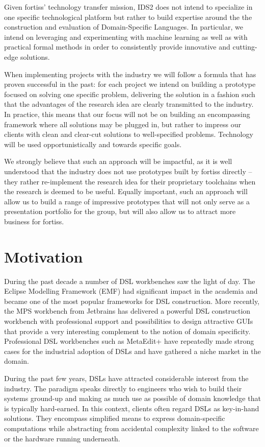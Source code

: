 \documentclass{article}
\begin{document}
Given fortiss' technology transfer mission, IDS2 does not intend to specialize
in one specific technological platform but rather to build expertise around the
the construction and evaluation of Domain-Specific Languages. In particular, we
intend on leveraging and experimenting with machine learning as well as with
practical formal methods in order to consistently provide innovative and
cutting-edge solutions.

When implementing projects with the industry we will follow a formula that has
proven successful in the past: for each project we intend on building a
prototype focused on solving one specific problem, delivering the solution in a
fashion such that the advantages of the research idea are clearly transmitted to
the industry. In practice, this means that our focus will not be on building an
encompassing framework where all solutions may be plugged in, but rather to
impress our clients with clean and clear-cut solutions to well-specified
problems. Technology will be used opportunistically and towards specific goals.

We strongly believe that such an approach will be impactful, as it is well
understood that the industry does not use prototypes built by fortiss directly
-- they rather re-implement the research idea for their proprietary toolchains when
the research is deemed to be useful. Equally important, such an approach will
allow us to build a range of impressive prototypes that will not only serve as a
presentation portfolio for the group, but will also allow us to attract more
business for fortiss.

\section{Motivation}

During the past decade a number of DSL workbenches saw the light of day. The
Eclipse Modelling Framework (EMF) had significant impact in the academia and
became one of the most popular frameworks for DSL construction. More recently,
the MPS workbench from Jetbrains has delivered a powerful DSL construction
workbench with professional support and possibilities to design attractive GUIs
that provide a very interesting complement to the notion of domain specificity.
Professional DSL workbenches such as MetaEdit+ have repeatedly made strong cases
for the industrial adoption of DSLs and have gathered a niche market in the
domain.

During the past few years, DSLs have attracted considerable interest from the
industry. The paradigm speaks directly to engineers who wish to build their
systems ground-up and making as much use as possible of domain knowledge that is
typically hard-earned. In this context, clients often regard DSLs as key-in-hand
solutions. They encompass simplified means to express domain-specific
computations while abstracting from accidental complexity linked to the software or the hardware
running underneath.
\end{document}
